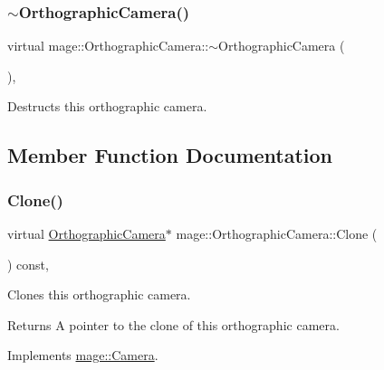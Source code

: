 \subsubsection{\texorpdfstring{$\sim$\+Orthographic\+Camera()}{~OrthographicCamera()}}
{\footnotesize\ttfamily virtual mage\+::\+Orthographic\+Camera\+::$\sim$\+Orthographic\+Camera (\begin{DoxyParamCaption}{ }\end{DoxyParamCaption})\hspace{0.3cm}{\ttfamily [virtual]}, {\ttfamily [default]}}

Destructs this orthographic camera. 

\subsection{Member Function Documentation}
\hypertarget{classmage_1_1_orthographic_camera_ae075c08e4af88f74212bf5c84d2e5b2a}{}\label{classmage_1_1_orthographic_camera_ae075c08e4af88f74212bf5c84d2e5b2a} 
\subsubsection{\texorpdfstring{Clone()}{Clone()}}
{\footnotesize\ttfamily virtual \hyperlink{classmage_1_1_orthographic_camera}{Orthographic\+Camera}$\ast$ mage\+::\+Orthographic\+Camera\+::\+Clone (\begin{DoxyParamCaption}{ }\end{DoxyParamCaption}) const\hspace{0.3cm}{\ttfamily [override]}, {\ttfamily [virtual]}}

Clones this orthographic camera.

\begin{DoxyReturn}{Returns}
A pointer to the clone of this orthographic camera. 
\end{DoxyReturn}


Implements \hyperlink{classmage_1_1_camera_a19301c2256c183db50b5e9406f7b5f3c}{mage\+::\+Camera}.

\hypertarget{classmage_1_1_orthographic_camera_a596e2cf22fee8cf30139ffe9d4cdcda7}{}\label{classmage_1_1_orthographic_camera_a596e2cf22fee8cf30139ffe9d4cdcda7} 
